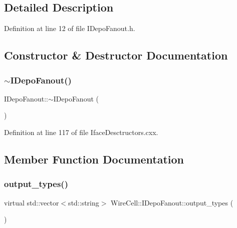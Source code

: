 \subsection{Detailed Description}


Definition at line 12 of file I\+Depo\+Fanout.\+h.



\subsection{Constructor \& Destructor Documentation}
\mbox{\label{class_wire_cell_1_1_i_depo_fanout_ad68fb48fa728917a8dfe9efc89537e02}} 
\subsubsection{\texorpdfstring{$\sim$\+I\+Depo\+Fanout()}{~IDepoFanout()}}
{\footnotesize\ttfamily I\+Depo\+Fanout\+::$\sim$\+I\+Depo\+Fanout (\begin{DoxyParamCaption}{ }\end{DoxyParamCaption})\hspace{0.3cm}{\ttfamily [virtual]}}



Definition at line 117 of file Iface\+Desctructors.\+cxx.



\subsection{Member Function Documentation}
\mbox{\label{class_wire_cell_1_1_i_depo_fanout_ade8cfbdf790d316516ab8f7a97818f8e}} 
\subsubsection{\texorpdfstring{output\+\_\+types()}{output\_types()}}
{\footnotesize\ttfamily virtual std\+::vector$<$std\+::string$>$ Wire\+Cell\+::\+I\+Depo\+Fanout\+::output\+\_\+types (\begin{DoxyParamCaption}{ }\end{DoxyParamCaption})\hspace{0.3cm}{\ttfamily [pure virtual]}}



